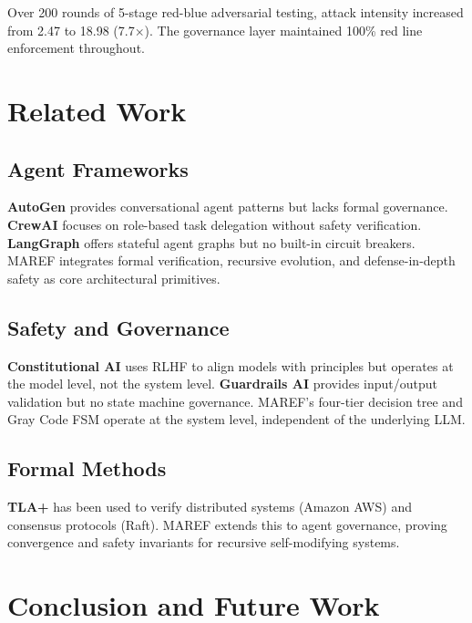 \documentclass[11pt,a4paper]{article}
\begin{document}
Over 200 rounds of 5-stage red-blue adversarial testing, attack intensity increased from 2.47 to 18.98 (7.7$\times$). The governance layer maintained 100\% red line enforcement throughout.

\section{Related Work}
\label{sec:related}

\subsection{Agent Frameworks}

\textbf{AutoGen} \cite{microsoft2023autogen} provides conversational agent patterns but lacks formal governance. \textbf{CrewAI} \cite{crewai2024} focuses on role-based task delegation without safety verification. \textbf{LangGraph} \cite{langgraph2024} offers stateful agent graphs but no built-in circuit breakers. MAREF integrates formal verification, recursive evolution, and defense-in-depth safety as core architectural primitives.

\subsection{Safety and Governance}

\textbf{Constitutional AI} \cite{bai2022constitutional} uses RLHF to align models with principles but operates at the model level, not the system level. \textbf{Guardrails AI} provides input/output validation but no state machine governance. MAREF's four-tier decision tree and Gray Code FSM operate at the system level, independent of the underlying LLM.

\subsection{Formal Methods}

\textbf{TLA+} \cite{lamport2002specifying} has been used to verify distributed systems (Amazon AWS) and consensus protocols (Raft). MAREF extends this to agent governance, proving convergence and safety invariants for recursive self-modifying systems.

\section{Conclusion and Future Work}
\label{sec:conclusion}
\end{document}

